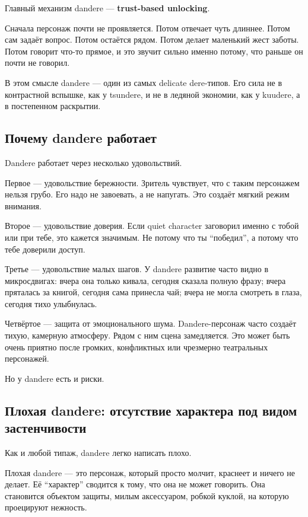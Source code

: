 Главный механизм dandere --- \textbf{trust-based unlocking}.

Сначала персонаж почти не проявляется. Потом отвечает чуть длиннее.
Потом сам задаёт вопрос. Потом остаётся рядом. Потом делает маленький
жест заботы. Потом говорит что-то прямое, и это звучит сильно именно
потому, что раньше он почти не говорил.

В этом смысле dandere --- один из самых delicate dere-типов. Его сила не
в контрастной вспышке, как у tsundere, и не в ледяной экономии, как у
kuudere, а в постепенном раскрытии.

\subsection*{Почему dandere работает}

Dandere работает через несколько удовольствий.

Первое --- удовольствие бережности. Зритель чувствует, что с таким
персонажем нельзя грубо. Его надо не завоевать, а не напугать. Это
создаёт мягкий режим внимания.

Второе --- удовольствие доверия. Если quiet character заговорил именно с
тобой или при тебе, это кажется значимым. Не потому что ты ``победил'',
а потому что тебе доверили доступ.

Третье --- удовольствие малых шагов. У dandere развитие часто видно в
микросдвигах: вчера она только кивала, сегодня сказала полную фразу;
вчера пряталась за книгой, сегодня сама принесла чай; вчера не могла
смотреть в глаза, сегодня тихо улыбнулась.

Четвёртое --- защита от эмоционального шума. Dandere-персонаж часто
создаёт тихую, камерную атмосферу. Рядом с ним сцена замедляется. Это
может быть очень приятно после громких, конфликтных или чрезмерно
театральных персонажей.

Но у dandere есть и риски.

\subsection*{Плохая dandere: отсутствие характера под видом
застенчивости}

Как и любой типаж, dandere легко написать плохо.

Плохая dandere --- это персонаж, который просто молчит, краснеет и
ничего не делает. Её ``характер'' сводится к тому, что она не может
говорить. Она становится объектом защиты, милым аксессуаром, робкой
куклой, на которую проецируют нежность.

